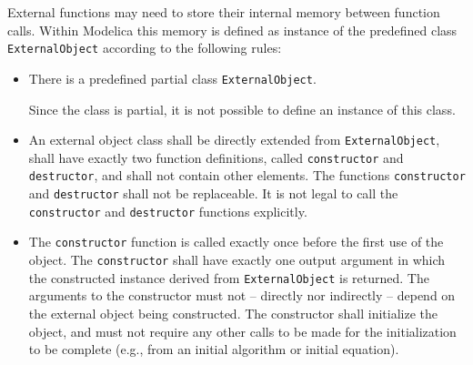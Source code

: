 External functions may need to store their internal memory between function calls.
Within Modelica this memory is defined as instance of the predefined class {\lstinline!ExternalObject!} according to the following rules:
\begin{itemize}
\item
  There is a predefined partial class {\lstinline!ExternalObject!}.
  \begin{nonnormative}
  Since the class is partial, it is not possible to define an instance of this class.
  \end{nonnormative}
\item
  An external object class shall be directly extended from {\lstinline!ExternalObject!}, shall have exactly two function definitions, called {\lstinline!constructor!} and {\lstinline!destructor!}, and shall not contain other elements.
  The functions {\lstinline!constructor!} and {\lstinline!destructor!} shall not be replaceable.
  It is not legal to call the {\lstinline!constructor!} and {\lstinline!destructor!} functions explicitly.
\item
  The {\lstinline!constructor!} function is called exactly once before the first use of the object.
  The {\lstinline!constructor!} shall have exactly one output argument in which the constructed instance derived from {\lstinline!ExternalObject!} is returned.
  The arguments to the constructor must not -- directly nor indirectly -- depend on the external object being constructed.
  The constructor shall initialize the object, and must not require any other calls to be made for the initialization to be complete (e.g., from an initial algorithm or initial equation).


\end{itemize}
